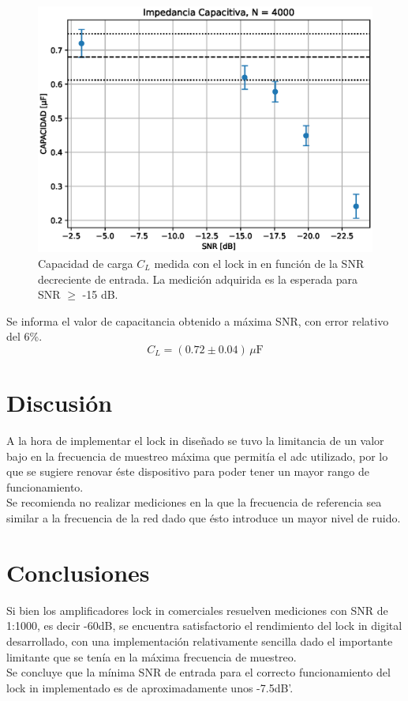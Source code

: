 \documentclass[11pt,a4paper]{extarticle}
\begin{document}
\begin{multicols}{2}
\begin{figure}[H]
	\centering
	\includegraphics[width=\linewidth]{Images/capacitor4000.eps}
	\caption{Capacidad de carga $C_L$ medida con 
	el lock in en función de la SNR decreciente de entrada.
	La medición adquirida es la esperada para SNR $\ge$ -15 dB.}
	\label{fig:CvsSNR}
\end{figure}

Se informa el valor de capacitancia obtenido a máxima SNR, con error relativo del 6\%.
\begin{equation*}
	C_L = \left(0.72 \pm 0.04\right) \, \mu \mathrm F
\end{equation*}

\section{Discusión}
A la hora de implementar el lock in diseñado se tuvo 
la limitancia de un valor bajo en la frecuencia de 
muestreo máxima que permitía el adc utilizado, por lo 
que se sugiere renovar éste 
dispositivo para poder tener un mayor 
rango de funcionamiento.\\

Se recomienda no realizar mediciones 
en la que la frecuencia de referencia sea 
similar a la frecuencia de la red dado que 
ésto introduce un mayor nivel de ruido.


\section{Conclusiones}

Si bien los amplificadores lock in comerciales resuelven 
mediciones con SNR de 1:1000, es decir -60dB,
 se encuentra satisfactorio 
el rendimiento del lock in digital desarrollado, con 
una implementación relativamente sencilla dado el importante 
limitante que se tenía en la máxima frecuencia de muestreo.\\

Se concluye que la mínima SNR de entrada para el 
correcto funcionamiento del lock in implementado es de 
aproximadamente unos -7.5dB'.




\end{multicols}
\end{document}
